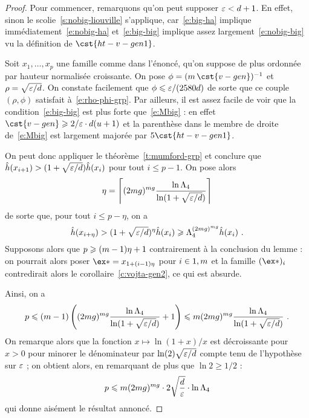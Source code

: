 \begin{proof}
  Pour commencer, remarquons qu'on peut supposer \( \varepsilon < d + 1 \). En effet,
  sinon le scolie~\vref{s:nobig-liouville} s'applique, car~\eqref{e:big-ha}
  implique immédiatement~\eqref{e:nobig-ha} et~\eqref{e:big-big} implique
  assez largement~\eqref{e:nobig-big} vu la définition de \( \cst{ht-v-gen1}
  \).

  Soit \( x_1, \dots, x_p \) une famille comme dans l'énoncé, qu'on suppose de
  plus ordonnée par hauteur normalisée croissante. On pose
  \( \phi =( \puiss \, \cst{v-gen})^{-1} \) et
  \( \rho = \sqrt{ \varepsilon / d } \).  On constate facilement que
  \( \phi \leqslant \varepsilon / (2580 d) \) de sorte que ce couple \( (\rho, \phi) \)
  satisfait à~\eqref{e:rho-phi-grp}. Par ailleurs, il est assez facile de voir
  que la condition~\eqref{e:big-big} est plus forte que~\eqref{e:Mbig} : en
  effet \( \cst{v-gen} \ge 2/\expapx \cdot \adeg (\adim+1) \) et la parenthèse
  dans le membre de droite de~\eqref{e:Mbig} est largement majorée par \( 5
    \cst{ht-v-gen1} \).

  On peut donc appliquer le théorème~\vref{t:mumford-grp} et conclure que
  \( \hat h ( x_{i+1} ) > (1 + \sqrt{\varepsilon / d}) \hat h ( x_i ) \) pour tout
  \( i \le p-1 \). On pose alors
  \begin{equation}
    \eta
    =
    \left\lceil
      (2mg)^{mg}
      \frac{ \ln \Lambda_4 }{ \ln (1 + \sqrt{\varepsilon / d}) }
    \right\rceil
  \end{equation}
  de sorte que, pour tout \( i \le p - \eta \), on a
  \begin{equation}
    \hat h ( x_{i+\eta} )
    >
    (1 + \sqrt{\varepsilon / d})^\eta
    \hat h ( x_i )
    \geqslant
    \Lambda_4^{(2mg)^{mg}}
    \hat h ( x_i )
    \text{ .}
  \end{equation}
  Supposons alors que \( p \geqslant (m - 1) \eta + 1 \) contrairement à la
  conclusion du lemme : on pourrait alors poser \( \ex* = x_{1 + (\fct-1)
      \eta} \) pour \( i \in {1, m} \) et la famille \( (\ex*)_\fct \)
  contredirait alors le corollaire~\vref{c:vojta-gen2}, ce qui est absurde.

  Ainsi, on a
  \begin{equation}
    p
    \leqslant
    (m - 1)
    \left(
      (2mg)^{mg}
      \frac{ \ln \Lambda_4 }{ \ln (1 + \sqrt{\varepsilon / d}) }
      + 1
    \right)
    \leqslant
    m
    (2mg)^{mg}
    \frac{ \ln \Lambda_4 }{ \ln (1 + \sqrt{\varepsilon / d}) }
    \text{ .}
  \end{equation}
  On remarque alors que la fonction \( x \mapsto \ln(1+x)/x \) est
  décroissante pour \( x > 0 \) pour minorer le dénominateur par \( \ln(2)
    \sqrt{\varepsilon / d} \) compte tenu de l'hypothèse sur \( \varepsilon \) ; on
  obtient alors, en remarquant de plus que \( \ln 2 \ge 1/2 \) :
  \begin{equation}
    p
    \leqslant
    m (2mg)^{mg}
    \cdot 2 \sqrt{\frac d {\varepsilon}}
    \cdot \ln \Lambda_4
  \end{equation}
  qui donne aisément le résultat annoncé.
\end{proof}


